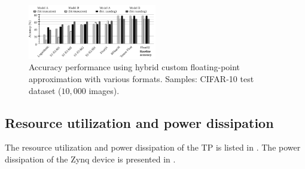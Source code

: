 \begin{figure}[t!]
	\centering
	\includegraphics[width=0.5\textwidth]{../figures/all_models_accuracy.pdf}
	\caption{Accuracy performance using hybrid custom floating-point approximation with various formats. Samples: CIFAR-10 test dataset ($10,000$ images).}
	\label{fig:accuracy}
\end{figure}

\subsection{Resource utilization and power dissipation}
The resource utilization and power dissipation of the TP is listed in . The power dissipation of the Zynq device is presented in . 


